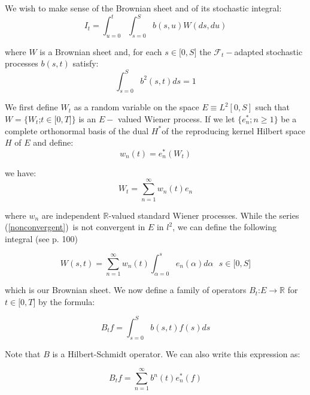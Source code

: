 \documentclass{article}
\begin{document}
\bigskip

We wish to make sense of the Brownian sheet and of its stochastic integral:%
\begin{equation}
I_{t}=\int_{u=0}^{t}\int_{s=0}^{S}b(s,u)W(ds,du)  \label{continuous}
\end{equation}%
\bigskip

where $W$ is a Brownian sheet and, for each $s\in \lbrack 0,S]$ the $%
\mathcal{F}_{t}-$adapted stochastic processes $b(s,t)$ satisfy:%
\begin{equation*}
\int_{s=0}^{S}b^{2}(s,t)ds=1
\end{equation*}

We first define $W_{t}$ as a random variable on the space $E\equiv
L^{2}[0,S] $ such that $W=\{W_{t}$;$t\in \lbrack 0,T]\}$ is an $E-$ valued
Wiener process. If we let $\{e_{n}^{\ast };n\geq 1\}$ be a complete
orthonormal basis of the dual $H^{\ast }$of the reproducing kernel Hilbert
space $H$ of $E$ and define:%
\begin{equation*}
w_{n}(t)=e_{n}^{\ast }(W_{t})
\end{equation*}

we have:%
\begin{equation}
W_{t}=\sum_{n=1}^{\infty }w_{n}(t)e_{n}  \label{nonconvergent}
\end{equation}

where $w_{n}$ are independent $\mathbb{R}$-valued standard Wiener processes.
While the series (\ref{nonconvergent})\ is not convergent in $E$ in $l^{2}$,
we can define the following integral (see \cite{DPZ92} p. 100)

\begin{equation*}
W(s,t)=\sum_{n=1}^{\infty }w_{n}(t)\int_{\alpha=0}^{s}e_{n}(\alpha )d\alpha
\text{ \ \ }s\in \lbrack 0,S]
\end{equation*}

which is our Brownian sheet. We now define a family of operators $B_{t}$:$%
E\rightarrow \mathbb{R}$ for $t\in \lbrack 0,T]$ by the formula:

\begin{equation*}
B_{t}f=\int_{s=0}^{S}b(s,t)f(s)ds
\end{equation*}

Note that $B$ is a Hilbert-Schmidt operator. We can also write this
expression as:

\begin{equation*}
B_{t}f=\sum_{n=1}^{\infty }b^{n}(t)e_{n}^{\ast }(f)
\end{equation*}
\end{document}
